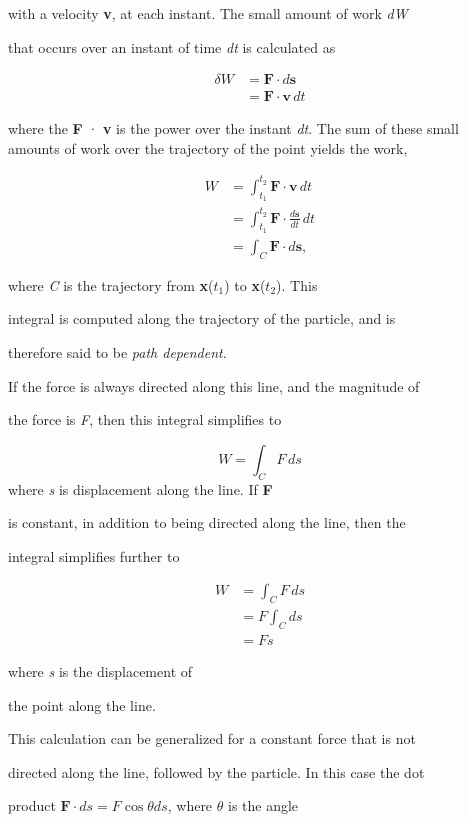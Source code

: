 with a velocity \textbf{v}, at each instant. The small amount of work \textit{dW}

that occurs over an instant of time \textit{dt} is calculated as


\begin{align}
\delta W &= \mathbf{F}\cdot d\mathbf{s} \\&= \mathbf{F}\cdot\mathbf{v}\,dt
\end{align}


where the \textbf{F} · \textbf{v} is the power over the instant \textit{dt}. The sum of these small amounts of work over the trajectory of the point yields the work,


\begin{align}
W &=  \int _{t_1}^{t_2}\mathbf{F} \cdot \mathbf{v}\,dt \\&=  \int _{t_1}^{t_2}\mathbf{F} \cdot \tfrac{d\mathbf{s}}{dt}\,dt \\&= \int_C \mathbf{F} \cdot d\mathbf{s},
\end{align}


where \textit{C} is the trajectory from \textbf{x}($t_1$) to \textbf{x}($t_2$). This

integral is computed along the trajectory of the particle, and is

therefore said to be \textit{path dependent}.


If the force is always directed along this line, and the magnitude of

the force is \textit{F}, then this integral simplifies to


\[
W = \int_C F\,ds
\] where \textit{s} is displacement along the line. If \textbf{F}

is constant, in addition to being directed along the line, then the

integral simplifies further to


\begin{align}
W &= \int_C F\,ds \\&= F\int_C ds \\&= Fs
\end{align}


where \textit{s} is the displacement of

the point along the line.


This calculation can be generalized for a constant force that is not

directed along the line, followed by the particle. In this case the dot

product $ \mathbf{F} \cdot ds = F \cos \theta ds$, where $\theta$ is the angle

